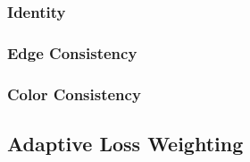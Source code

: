 \documentclass[twoside,english,notitlepage]{report}
\begin{document}
\subsubsection{Identity}

\subsubsection{Edge Consistency}

\subsubsection{Color Consistency}

\subsection{Adaptive Loss Weighting}








\end{document}
